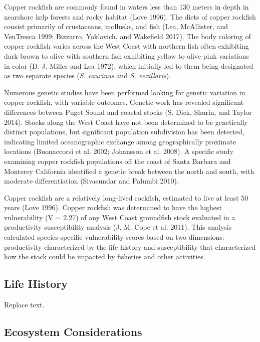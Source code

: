 \documentclass[11pt,
  english,
  letterpaper,
]{article}
\begin{document}
Copper rockfish are commonly found in waters less than 130 meters in depth in nearshore kelp forests and rocky habitat (Love 1996). The diets of copper rockfish consist primarily of crustaceans, mollusks, and fish (Lea, McAllister, and VenTresca 1999; Bizzarro, Yoklavich, and Wakefield 2017). The body coloring of copper rockfish varies across the West Coast with northern fish often exhibiting dark brown to olive with southern fish exhibiting yellow to olive-pink variations in color (D. J. Miller and Lea 1972), which initially led to them being designated as two separate species (\emph{S. caurinus} and \emph{S. vexillaris}).

Numerous genetic studies have been performed looking for genetic variation in copper rockfish, with variable outcomes. Genetic work has revealed significant differences between Puget Sound and coastal stocks (S. Dick, Shurin, and Taylor 2014). Stocks along the West Coast have not been determined to be genetically distinct populations, but significant population subdivision has been detected, indicating limited oceanographic exchange among geographically proximate locations (Buonaccorsi et al. 2002; Johansson et al. 2008). A specific study examining copper rockfish populations off the coast of Santa Barbara and Monterey California identified a genetic break between the north and south, with moderate differentiation (Sivasundar and Palumbi 2010).

Copper rockfish are a relatively long-lived rockfish, estimated to live at least 50 years (Love 1996). Copper rockfish was determined to have the highest vulnerability (V = 2.27) of any West Coast groundfish stock evaluated in a productivity susceptibility analysis (J. M. Cope et al. 2011). This analysis calculated species-specific vulnerability scores based on two dimensions: productivity characterized by the life history and susceptibility that characterized how the stock could be impacted by fisheries and other activities.

\hypertarget{life-history}{%
\subsection{Life History}\label{life-history}}

Replace text.

\hypertarget{ecosystem-considerations-1}{%
\subsection{Ecosystem Considerations}\label{ecosystem-considerations-1}}
\end{document}
